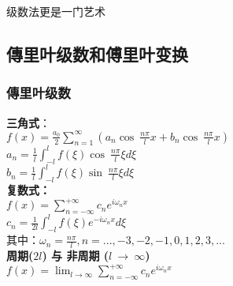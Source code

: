 \begin{note}
	级数法更是一门艺术
\end{note}

\subsection{傳里叶级数和傅里叶变换}
\subsubsection{傳里叶级数 }
\textbf{\large 三角式}：\\
{\large  $\displaystyle f(x) =\frac{a_0}{2} \sum_{n=1}^{\infty}  \left(  a_n \cos~ \frac{n\pi}{l} x +  b_n \cos~ \frac{n\pi}{l} x  \right) $ }\\	
{\large $\displaystyle a_n =\frac{1}{l}  \int_{-l}^{l}  f(\xi )   \cos~ \frac{n\pi}{l} \xi d\xi  $ }\\	
{\large $\displaystyle b_n =\frac{1}{l}  \int_{-l}^{l}  f(\xi )   \sin~ \frac{n\pi}{l} \xi d\xi   $ }\\	

\textbf{ \large 复数式：} \\  \vspace{0.3cm}
{\large  $\displaystyle f(x) =\sum_{n=-\infty}^{+\infty}  c_n e^{i\omega_n x} $ }\\	
{\large $\displaystyle c_n =\frac{1}{2l}  \int_{-l}^{l}  f(\xi)    e^{-i\omega_n x}  d\xi  $ }\\	
其中：{\large $\displaystyle   \omega_n=\frac{n\pi}{l} ,  n=...,-3,-2,-1,0,1,2,3,...   $} \\

\textbf{{\large 周期($2l$) 与 非周期 ($l~\to ~\infty$)}} \\
{\large  $\displaystyle f(x) =\lim_{l\to \infty} \sum_{n=-\infty}^{+\infty}  c_n e^{i\omega_n x} $ }\\	
\\	
\\
\\

